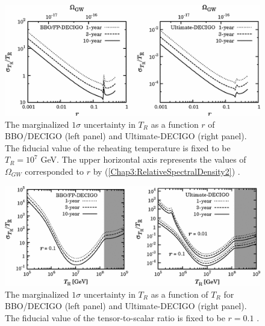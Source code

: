 \documentclass[11pt,a4paper,twoside]{book}
\begin{document}
\begin{figure}[]
	\centering
	\includegraphics[width=0.8\linewidth, height=0.25\textheight]{Images/Chap3/Kurojanagi_Nakayama_Fig4}
	\caption{The marginalized $ 1\sigma $ uncertainty in $ T_{R} $ as a function $ r $ of BBO/DECIGO (left panel) and Ultimate-DECIGO (right panel). The fiducial value of the reheating temperature is fixed to be $ T_{R}=10^{7} $ GeV. The upper horizontal axis represents the values of $ \Omega_{GW} $ corresponded to $ r $ by (\ref{Chap3:RelativeSpectralDensity2}) \cite{Chap3:ProspectsForDeterminationWithDetectors}. \label{fig:kurojanaginakayamafig4}}
\end{figure}
\begin{figure}[]
	\centering
	\includegraphics[width=0.8\linewidth, height=0.25\textheight]{Images/Chap3/Kurojanagi_Nakayama_Fig5}
	\caption{The marginalized $ 1\sigma $ uncertainty in $ T_{R} $ as a function of $ T_{R} $ for BBO/DECIGO (left panel) and Ultimate-DECIGO (right panel). The fiducial value of the tensor-to-scalar ratio is fixed to be $ r=0.1 $ \cite{Chap3:ProspectsForDeterminationWithDetectors}.}
	\label{fig:kurojanaginakayamafig5}
\end{figure}
\end{document}
